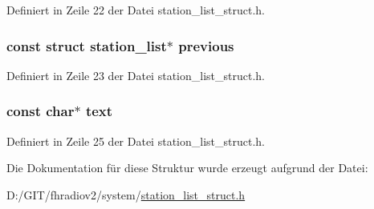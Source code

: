 Definiert in Zeile 22 der Datei station\+\_\+list\+\_\+struct.\+h.

\hypertarget{structstation__list_ae039c5ce88254ad89cea9170a5f3b740}{}
\subsubsection[{previous}]{\setlength{\rightskip}{0pt plus 5cm}const struct {\bf station\+\_\+list}$\ast$ previous}\label{structstation__list_ae039c5ce88254ad89cea9170a5f3b740}


Definiert in Zeile 23 der Datei station\+\_\+list\+\_\+struct.\+h.

\hypertarget{structstation__list_a16343090e80c4472521560f30113d96c}{}
\subsubsection[{text}]{\setlength{\rightskip}{0pt plus 5cm}const char$\ast$ text}\label{structstation__list_a16343090e80c4472521560f30113d96c}


Definiert in Zeile 25 der Datei station\+\_\+list\+\_\+struct.\+h.



Die Dokumentation für diese Struktur wurde erzeugt aufgrund der Datei\+:\begin{DoxyCompactItemize}
\item 
D\+:/\+G\+I\+T/fhradiov2/system/\hyperlink{station__list__struct_8h}{station\+\_\+list\+\_\+struct.\+h}\end{DoxyCompactItemize}
